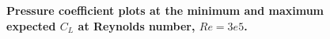 \documentclass[]{aiaa-tc}%
\begin{document}
\begin{figure}[H]
 \begin{subfigmatrix}{2}%
 \end{subfigmatrix}
 \caption{\textbf{ Pressure coefficient plots at the minimum and maximum expected $C_L$ at Reynolds number, $Re=3e5$.  }}
 \label{f:jhcps}
\end{figure}



\end{document}
